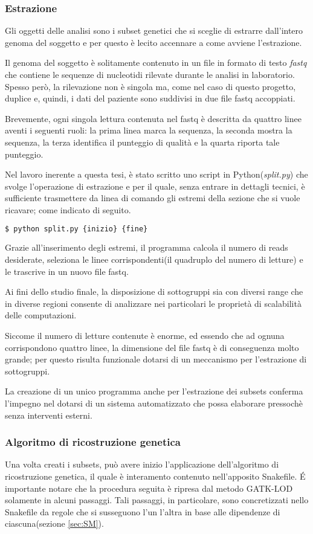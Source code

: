 \subsubsection{Estrazione}
Gli oggetti delle analisi sono i subset genetici che si sceglie di estrarre dall'intero genoma del soggetto e per questo è lecito accennare a come avviene l'estrazione.

Il genoma del soggetto è solitamente contenuto in un file in formato di testo \textit{fastq} che contiene le sequenze di nucleotidi rilevate durante le analisi in laboratorio.
Spesso però, la rilevazione non è singola ma, come nel caso di questo progetto, duplice e, quindi, i dati del paziente sono suddivisi in due file fastq accoppiati.

Brevemente, ogni singola lettura contenuta nel fastq è descritta da quattro linee aventi i seguenti ruoli: la prima linea marca la sequenza, la seconda mostra la sequenza, la terza identifica il punteggio di qualità e la quarta riporta tale punteggio.


Nel lavoro inerente a questa tesi, è stato scritto uno script in Python(\textit{split.py}) che svolge l'operazione di estrazione e per il quale, senza entrare in dettagli tecnici, è sufficiente trasmettere da linea di comando gli estremi della sezione che si vuole ricavare; come indicato di seguito.
\begin{lstlisting}[language=Python]
$ python split.py {inizio} {fine}
\end{lstlisting}
Grazie all'inserimento degli estremi, il programma calcola il numero di reads desiderate, seleziona le linee corrispondenti(il quadruplo del numero di letture) e le trascrive in un nuovo file fastq.

Ai fini dello studio finale, la disposizione di sottogruppi sia con diversi range che in diverse regioni consente di analizzare nei particolari le proprietà di scalabilità delle computazioni.

Siccome il numero di letture contenute è enorme, ed essendo che ad ognuna corrispondono quattro linee, la dimensione del file fastq è di conseguenza molto grande; per questo risulta funzionale dotarsi di un meccanismo per l'estrazione di sottogruppi.

La creazione di un unico programma anche per l'estrazione dei subsets conferma l'impegno nel dotarsi di un sistema automatizzato che possa elaborare pressochè senza interventi esterni.


\subsubsection{Algoritmo di ricostruzione genetica}
Una volta creati i subsets, può avere inizio l'applicazione dell'algoritmo di ricostruzione genetica, il quale è interamento contenuto nell'apposito Snakefile.
\'E importante notare che la procedura seguita è ripresa dal metodo GATK-LOD solamente in alcuni passaggi.
Tali passaggi, in particolare, sono concretizzati nello Snakefile da regole che si susseguono l'un l'altra in base alle dipendenze di ciascuna(sezione \ref{sec:SM}).

